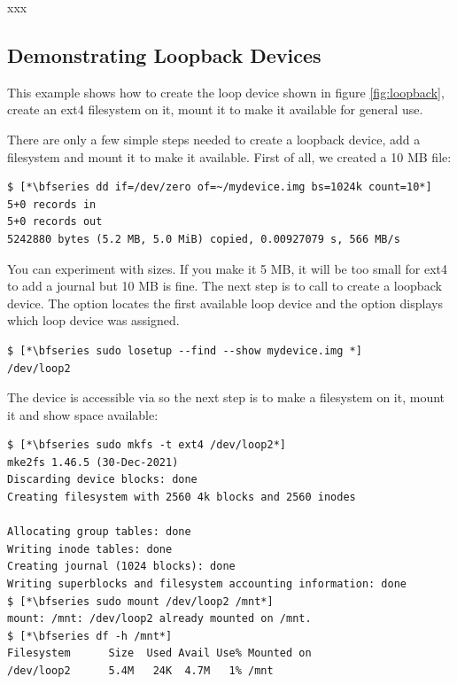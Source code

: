 \noindent
xxx

\subsection{Demonstrating Loopback Devices}

This example shows how to create the loop device shown in figure \ref{fig:loopback}, create an ext4 filesystem on it, mount it to make it available for general use.

There are only a few simple steps needed to create a loopback device, add a filesystem and mount it to make it available. First of all, we created a 10 MB file:

\begin{lstlisting}
$ [*\bfseries dd if=/dev/zero of=~/mydevice.img bs=1024k count=10*]
5+0 records in
5+0 records out
5242880 bytes (5.2 MB, 5.0 MiB) copied, 0.00927079 s, 566 MB/s
\end{lstlisting}

\noindent
You can experiment with sizes. If you make it 5 MB, it will be too small for ext4 to add a journal but 10 MB is fine. The next step is to call  to create a loopback device. The  option locates the first available loop device and the  option displays which loop device was assigned.

\begin{lstlisting}
$ [*\bfseries sudo losetup --find --show mydevice.img *]
/dev/loop2
\end{lstlisting}

\noindent
The device is accessible via  so the next step is to make a filesystem on it, mount it and show space available:

\begin{lstlisting}
$ [*\bfseries sudo mkfs -t ext4 /dev/loop2*]
mke2fs 1.46.5 (30-Dec-2021)
Discarding device blocks: done                            
Creating filesystem with 2560 4k blocks and 2560 inodes

Allocating group tables: done                            
Writing inode tables: done                            
Creating journal (1024 blocks): done
Writing superblocks and filesystem accounting information: done
$ [*\bfseries sudo mount /dev/loop2 /mnt*]
mount: /mnt: /dev/loop2 already mounted on /mnt.
$ [*\bfseries df -h /mnt*]
Filesystem      Size  Used Avail Use% Mounted on
/dev/loop2      5.4M   24K  4.7M   1% /mnt
\end{lstlisting}


